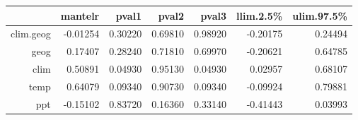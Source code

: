 \begin{table}[ht]
\centering
\begin{tabular}{rrrrrrr}
  \hline
 & mantelr & pval1 & pval2 & pval3 & llim.2.5\% & ulim.97.5\% \\ 
  \hline
clim.geog & -0.01254 & 0.30220 & 0.69810 & 0.98920 & -0.20175 & 0.24494 \\ 
  geog & 0.17407 & 0.28240 & 0.71810 & 0.69970 & -0.20621 & 0.64785 \\ 
  clim & 0.50891 & 0.04930 & 0.95130 & 0.04930 & 0.02957 & 0.68107 \\ 
  temp & 0.64079 & 0.09340 & 0.90730 & 0.09340 & -0.09924 & 0.79881 \\ 
  ppt & -0.15102 & 0.83720 & 0.16360 & 0.33140 & -0.41443 & 0.03993 \\ 
   \hline
\end{tabular}
\end{table}
